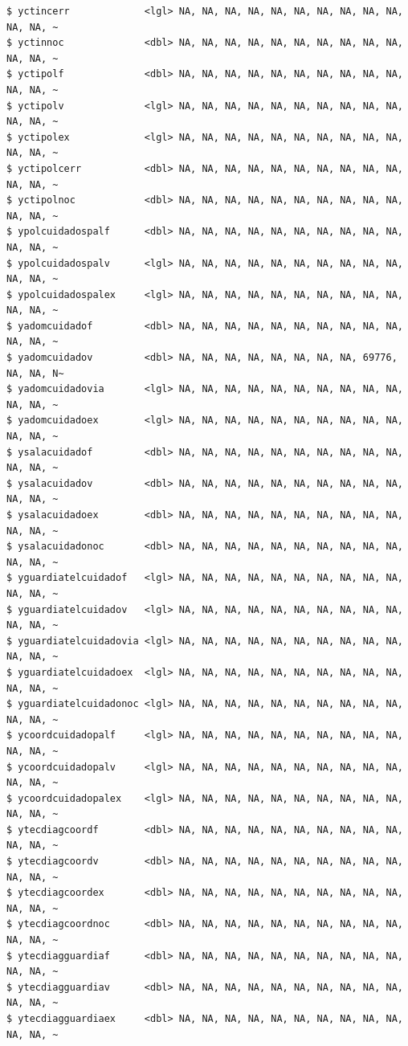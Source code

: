 \documentclass[
  letterpaper,
  DIV=11,
  numbers=noendperiod]{scrreprt}
\begin{document}
\begin{verbatim}
$ yctincerr             <lgl> NA, NA, NA, NA, NA, NA, NA, NA, NA, NA, NA, NA, ~
$ yctinnoc              <dbl> NA, NA, NA, NA, NA, NA, NA, NA, NA, NA, NA, NA, ~
$ yctipolf              <dbl> NA, NA, NA, NA, NA, NA, NA, NA, NA, NA, NA, NA, ~
$ yctipolv              <lgl> NA, NA, NA, NA, NA, NA, NA, NA, NA, NA, NA, NA, ~
$ yctipolex             <lgl> NA, NA, NA, NA, NA, NA, NA, NA, NA, NA, NA, NA, ~
$ yctipolcerr           <dbl> NA, NA, NA, NA, NA, NA, NA, NA, NA, NA, NA, NA, ~
$ yctipolnoc            <dbl> NA, NA, NA, NA, NA, NA, NA, NA, NA, NA, NA, NA, ~
$ ypolcuidadospalf      <dbl> NA, NA, NA, NA, NA, NA, NA, NA, NA, NA, NA, NA, ~
$ ypolcuidadospalv      <lgl> NA, NA, NA, NA, NA, NA, NA, NA, NA, NA, NA, NA, ~
$ ypolcuidadospalex     <lgl> NA, NA, NA, NA, NA, NA, NA, NA, NA, NA, NA, NA, ~
$ yadomcuidadof         <dbl> NA, NA, NA, NA, NA, NA, NA, NA, NA, NA, NA, NA, ~
$ yadomcuidadov         <dbl> NA, NA, NA, NA, NA, NA, NA, NA, 69776, NA, NA, N~
$ yadomcuidadovia       <lgl> NA, NA, NA, NA, NA, NA, NA, NA, NA, NA, NA, NA, ~
$ yadomcuidadoex        <lgl> NA, NA, NA, NA, NA, NA, NA, NA, NA, NA, NA, NA, ~
$ ysalacuidadof         <dbl> NA, NA, NA, NA, NA, NA, NA, NA, NA, NA, NA, NA, ~
$ ysalacuidadov         <dbl> NA, NA, NA, NA, NA, NA, NA, NA, NA, NA, NA, NA, ~
$ ysalacuidadoex        <dbl> NA, NA, NA, NA, NA, NA, NA, NA, NA, NA, NA, NA, ~
$ ysalacuidadonoc       <dbl> NA, NA, NA, NA, NA, NA, NA, NA, NA, NA, NA, NA, ~
$ yguardiatelcuidadof   <lgl> NA, NA, NA, NA, NA, NA, NA, NA, NA, NA, NA, NA, ~
$ yguardiatelcuidadov   <lgl> NA, NA, NA, NA, NA, NA, NA, NA, NA, NA, NA, NA, ~
$ yguardiatelcuidadovia <lgl> NA, NA, NA, NA, NA, NA, NA, NA, NA, NA, NA, NA, ~
$ yguardiatelcuidadoex  <lgl> NA, NA, NA, NA, NA, NA, NA, NA, NA, NA, NA, NA, ~
$ yguardiatelcuidadonoc <lgl> NA, NA, NA, NA, NA, NA, NA, NA, NA, NA, NA, NA, ~
$ ycoordcuidadopalf     <lgl> NA, NA, NA, NA, NA, NA, NA, NA, NA, NA, NA, NA, ~
$ ycoordcuidadopalv     <lgl> NA, NA, NA, NA, NA, NA, NA, NA, NA, NA, NA, NA, ~
$ ycoordcuidadopalex    <lgl> NA, NA, NA, NA, NA, NA, NA, NA, NA, NA, NA, NA, ~
$ ytecdiagcoordf        <dbl> NA, NA, NA, NA, NA, NA, NA, NA, NA, NA, NA, NA, ~
$ ytecdiagcoordv        <dbl> NA, NA, NA, NA, NA, NA, NA, NA, NA, NA, NA, NA, ~
$ ytecdiagcoordex       <dbl> NA, NA, NA, NA, NA, NA, NA, NA, NA, NA, NA, NA, ~
$ ytecdiagcoordnoc      <dbl> NA, NA, NA, NA, NA, NA, NA, NA, NA, NA, NA, NA, ~
$ ytecdiagguardiaf      <dbl> NA, NA, NA, NA, NA, NA, NA, NA, NA, NA, NA, NA, ~
$ ytecdiagguardiav      <dbl> NA, NA, NA, NA, NA, NA, NA, NA, NA, NA, NA, NA, ~
$ ytecdiagguardiaex     <dbl> NA, NA, NA, NA, NA, NA, NA, NA, NA, NA, NA, NA, ~

\end{verbatim}
\end{document}
